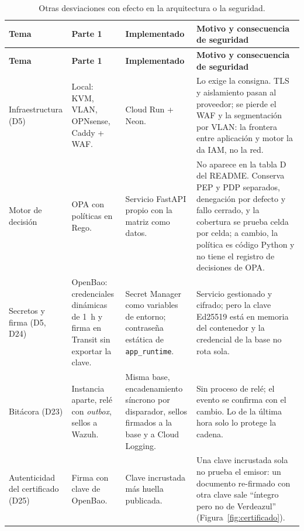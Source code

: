 \documentclass[10pt,letterpaper]{article}
\newcommand{\cod}[1]{\texttt{#1}}
\begin{document}
\begin{small}
\setlength{\tabcolsep}{4pt}
\begin{longtable}{@{}P{2.6cm}P{3.6cm}P{3.6cm}P{6.4cm}@{}}
\caption{Otras desviaciones con efecto en la arquitectura o la seguridad.}\label{tab:desviaciones}\\
\toprule
\footnotesize\textbf{Tema} & \footnotesize\textbf{Parte 1} & \footnotesize\textbf{Implementado} & \footnotesize\textbf{Motivo y consecuencia de seguridad}\\
\midrule
\endfirsthead
\toprule
\footnotesize\textbf{Tema} & \footnotesize\textbf{Parte 1} & \footnotesize\textbf{Implementado} & \footnotesize\textbf{Motivo y consecuencia de seguridad}\\
\midrule
\endhead
\footnotesize Infraestructura (D5) & \footnotesize Local: KVM, VLAN, OPNsense, Caddy + WAF. & \footnotesize Cloud Run + Neon. & \footnotesize Lo exige la consigna. TLS y aislamiento pasan al proveedor; se pierde el WAF y la segmentación por VLAN: la frontera entre aplicación y motor la da IAM, no la red.\\
\footnotesize Motor de decisión & \footnotesize OPA con políticas en Rego. & \footnotesize Servicio FastAPI propio con la matriz como datos. & \footnotesize No aparece en la tabla D del README. Conserva PEP y PDP separados, denegación por defecto y fallo cerrado, y la cobertura se prueba celda por celda; a cambio, la política es código Python y no tiene el registro de decisiones de OPA.\\
\footnotesize Secretos y firma (D5, D24) & \footnotesize OpenBao: credenciales dinámicas de 1~h y firma en Transit sin exportar la clave. & \footnotesize Secret Manager como variables de entorno; contraseña estática de \cod{app\_runtime}. & \footnotesize Servicio gestionado y cifrado; pero la clave Ed25519 está en memoria del contenedor y la credencial de la base no rota sola.\\
\footnotesize Bitácora (D23) & \footnotesize Instancia aparte, relé con \emph{outbox}, sellos a Wazuh. & \footnotesize Misma base, encadenamiento síncrono por disparador, sellos firmados a la base y a Cloud Logging. & \footnotesize Sin proceso de relé; el evento se confirma con el cambio. Lo de la última hora solo lo protege la cadena.\\
\footnotesize Autenticidad del certificado (D25) & \footnotesize Firma con clave de OpenBao. & \footnotesize Clave incrustada más huella publicada. & \footnotesize Una clave incrustada sola no prueba el emisor: un documento re-firmado con otra clave sale “íntegro pero no de Verdeazul” (Figura~\ref{fig:certificado}).\\

\end{longtable}
\end{small}
\end{document}

